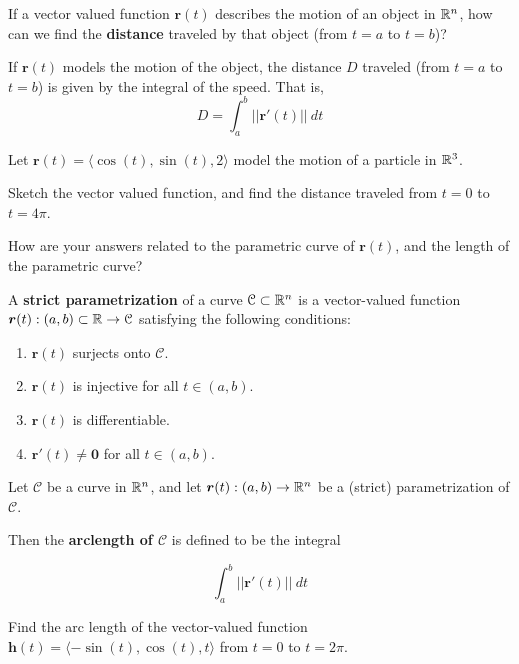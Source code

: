 If a vector valued function $\bm{r}(t)$ describes the motion of an object in $\mathbb{R}^n$, how can we find the \textbf{distance} traveled by that object (from $t=a$ to $t=b$)?

\begin{definition}
    If $\bm{r}(t)$ models the motion of the object, the distance $D$ traveled (from $t=a$ to $t=b$) is given by the integral of the speed. That is, 
    $$D = \int_a^b ||\bm{r}'(t)|| \ dt$$ 
    \end{definition}

\begin{example}
Let $\bm{r}(t) = \langle \cos(t), \sin(t), 2 \rangle$ model the motion of a particle in $\mathbb{R}^3$. 
    
    Sketch the vector valued function, and find the distance traveled from $t=0$ to $t = 4\pi$.
\end{example}

How are your answers related to the parametric curve of $\bm{r}(t)$, and the length of the parametric curve?

\begin{definition}[]
    A \textbf{strict parametrization} of a curve $\mathcal{C} \subset \mathbb{R}^n$ is a vector-valued function $\bm{r}(t) : (a,b) \subset \mathbb{R} \to \mathcal{C}$ satisfying the following conditions:
    \begin{enumerate}    
        \item $\bm{r}(t)$ surjects onto $\mathcal{C}$.
        \item $\bm{r}(t)$ is injective for all $t \in (a,b)$.
        \item $\bm{r}(t)$ is differentiable.
        \item $\bm{r}'(t) \neq \bm{0}$ for all $t \in (a,b)$.    
    \end{enumerate}
    
    \end{definition}

     \begin{definition}[Arclength]
    Let $\mathcal{C}$ be a curve in $\mathbb{R}^n$, and let $\bm{r}(t) : (a,b) \to \mathbb{R}^n$ be a (strict) parametrization of $\mathcal{C}$.  
    
    Then the \textbf{arclength of $\mathcal{C}$} is defined to be the integral 
    
    $$\int_a^b ||\bm{r}'(t)|| \ dt$$
    
    \end{definition}

    \begin{example}
        Find the arc length of the vector-valued function $\bm{h}(t) = \langle -\sin(t), \cos(t), t \rangle$ from $t=0$ to $t=2\pi$.
    \end{example}

